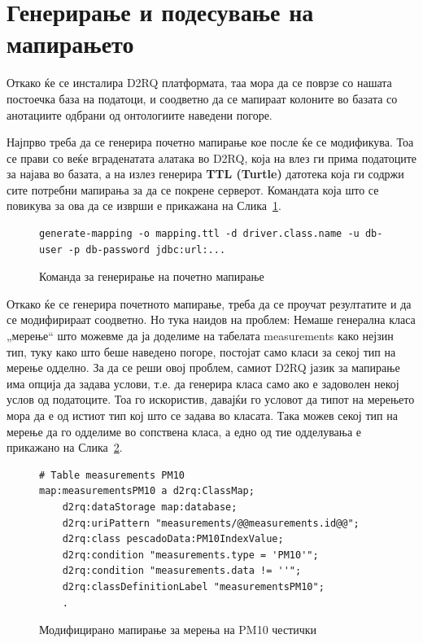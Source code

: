 \documentclass{uvamscse}
\begin{document}
\section{Генерирање и подесување на мапирањето}

Откако ќе се инсталира D2RQ платформата, таа мора да се поврзе со нашата постоечка база на податоци, и соодветно да се мапираат колоните во базата со анотациите одбрани од онтологиите наведени погоре.
\vspace{5mm}

Најпрво треба да се генерира почетно мапирање кое после ќе се модификува. Тоа се прави со веќе вграденатата алатака во D2RQ, која на влез ги прима податоците за најава во базата, а на излез генерира \textbf{TTL (Turtle)} датотека која ги содржи сите потребни мапирања за да се покрене серверот. Командата која што се повикува за ова да се изврши е прикажана на Слика~\ref{fig:pocetnoMapiranje}.

\begin{figure}[H]
\centering
\begin{snippet}
\begin{verbatim}
generate-mapping -o mapping.ttl -d driver.class.name -u db-user -p db-password jdbc:url:...
\end{verbatim}
\end{snippet}
\caption{Команда за генерирање на почетно мапирање}
\label{fig:pocetnoMapiranje}
\end{figure}
\vspace{5mm}

Откако ќе се генерира почетното мапирање, треба да се проучат резултатите и да се модифирираат соодветно. Но тука наидов на проблем: Немаше генерална класа „мерење“ што можевме да ја доделиме на табелата measurements како нејзин тип, туку како што беше наведено погоре, постојат само класи за секој тип на мерење одделно. За да се реши овој проблем, самиот D2RQ јазик за мапирање има опција да задава услови, т.е. да генерира класа само ако е задоволен некој услов од податоците. Тоа го искористив, давајќи го условот да типот на мерењето мора да е од истиот тип кој што се задава во класата. Така можев секој тип на мерење да го одделиме во сопствена класа, а едно од тие одделувања е прикажано на Слика~\ref{fig:pm10merenje}.

\begin{figure}[H]
\centering
\begin{snippet}
\begin{verbatim}
# Table measurements PM10
map:measurementsPM10 a d2rq:ClassMap;
	d2rq:dataStorage map:database;
	d2rq:uriPattern "measurements/@@measurements.id@@";
	d2rq:class pescadoData:PM10IndexValue;		
    d2rq:condition "measurements.type = 'PM10'";
    d2rq:condition "measurements.data != ''";
	d2rq:classDefinitionLabel "measurementsPM10";
	.
\end{verbatim}
\end{snippet}
\caption{Модифицирано мапирање за мерења на PM10 честички}
\label{fig:pm10merenje}
\end{figure}
\end{document}
